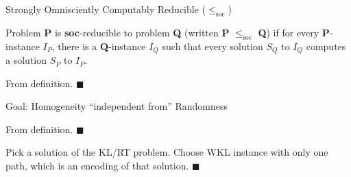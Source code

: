 \begin{frame}{Strongly Omnisciently Computably Reducible
($\leq_{\text{soc}}$)}
  \begin{define*}
    Problem \textbf{P} is \textbf{soc}-reducible to problem \textbf{Q}
    (written \textbf{P} $\leq_{\text{soc}}$ \textbf{Q}) if for every
    \textbf{P}-instance $I_P$, there is a \textbf{Q}-instance
    $I_Q$ such that every solution $S_{Q}$ to $I_Q$ computes a
    solution $S_P$ to $I_P$.
  \end{define*}

  \begin{observe*}
    From definition. $\blacksquare$
  \end{observe*}

  \begin{center}
  \end{center}
\end{frame}

\begin{frame}{Goal: Homogeneity ``independent from'' Randomness}
  \begin{observe*}
    From definition. $\blacksquare$
  \end{observe*}

  \begin{observe*}
    Pick a solution of the KL/RT problem. Choose WKL instance with only
    one path, which is an encoding of that solution. $\blacksquare$
  \end{observe*}

  \begin{center}
  \end{center}
\end{frame}
